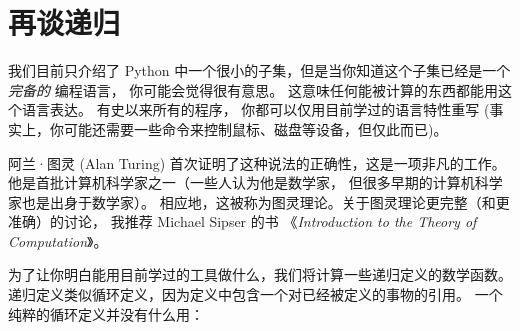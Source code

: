 \section{再谈递归}
\label{more.recursion}
  
    


我们目前只介绍了 Python 中一个很小的子集，但是当你知道这个子集已经是一个 {\em 完备的} 编程语言， 你可能会觉得很有意思。
这意味任何能被计算的东西都能用这个语言表达。
有史以来所有的程序， 你都可以仅用目前学过的语言特性重写 (事实上，你可能还需要一些命令来控制鼠标、磁盘等设备，但仅此而已)。


阿兰·图灵 (Alan Turing) 首次证明了这种说法的正确性，这是一项非凡的工作。
他是首批计算机科学家之一（一些人认为他是数学家，
但很多早期的计算机科学家也是出身于数学家）。
相应地，这被称为图灵理论。关于图灵理论更完整（和更准确）的讨论，
我推荐 Michael Sipser 的书 《{\em Introduction to the Theory of Computation}》。


为了让你明白能用目前学过的工具做什么，我们将计算一些递归定义的数学函数。
递归定义类似循环定义，因为定义中包含一个对已经被定义的事物的引用。
一个纯粹的循环定义并没有什么用：


